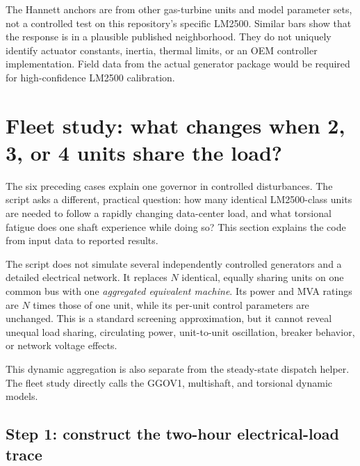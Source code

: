 \documentclass[11pt]{article}
\begin{document}
\begin{cautionbox}
The Hannett anchors are from other gas-turbine units and model parameter sets,
not a controlled test on this repository's specific LM2500.  Similar bars show
that the response is in a plausible published neighborhood.  They do not
uniquely identify actuator constants, inertia, thermal limits, or an OEM
controller implementation.  Field data from the actual generator package
would be required for high-confidence LM2500 calibration.
\end{cautionbox}

\section{Fleet study: what changes when 2, 3, or 4 units share the load?}
\label{sec:fleet}

The six preceding cases explain one governor in controlled disturbances.
The script  asks a different, practical
question: how many identical LM2500-class units are needed to follow a rapidly
changing data-center load, and what torsional fatigue does one shaft
experience while doing so?  This section explains the code from input data to
reported results.

\begin{novicebox}
The script does not simulate several independently controlled generators and
a detailed electrical network.  It replaces $N$ identical, equally sharing
units on one common bus with one \emph{aggregated equivalent machine}.  Its
power and MVA ratings are $N$ times those of one unit, while its per-unit
control parameters are unchanged.  This is a standard screening
approximation, but it cannot reveal unequal load sharing, circulating power,
unit-to-unit oscillation, breaker behavior, or network voltage effects.

This dynamic aggregation is also separate from the steady-state
 dispatch helper.  The fleet study directly calls the
GGOV1, multishaft, and torsional dynamic models.
\end{novicebox}

\subsection{Step 1: construct the two-hour electrical-load trace}
\end{document}
